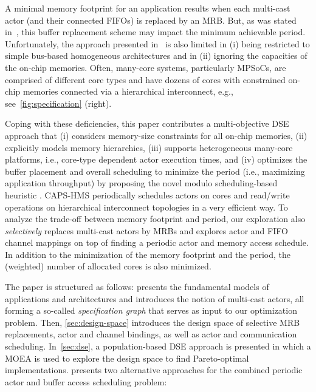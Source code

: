 A minimal memory footprint for an application results when each multi-cast actor (and their connected \acp{FIFO}) is replaced by an \ac{MRB}.
But, as was stated in~\cite{lft_2023-MRBs}, this buffer replacement scheme may impact the minimum achievable period.
Unfortunately, the approach presented in~\cite{lft_2023-MRBs} is also limited in
(i) being restricted to simple bus-based homogeneous architectures and
in (ii) ignoring the capacities of the on-chip memories.
Often, many-core systems, particularly \acp{MPSoC}, are comprised of different core types and have dozens of cores with constrained on-chip memories connected via a hierarchical interconnect, e.g., see~\cref{fig:specification} (right).
\par
Coping with these deficiencies, this paper contributes a multi-objective \ac{DSE} approach that
(i) considers memory-size constraints for all on-chip memories,
(ii) explicitly models memory hierarchies,
(iii) supports heterogeneous many-core platforms, i.e., core-type dependent actor execution times, and
(iv) optimizes the buffer placement and overall scheduling to minimize the period (i.e., maximizing application throughput) by proposing the novel modulo scheduling-based heuristic .
\ac{CAPS-HMS} periodically schedules actors on cores and read/write operations on hierarchical interconnect topologies in a very efficient way.
To analyze the trade-off between memory footprint and period, our exploration also \emph{selectively} replaces multi-cast actors by \acp{MRB} and explores actor and \ac{FIFO} channel mappings on top of finding a periodic actor and memory access schedule.
In addition to the minimization of the memory footprint and the period, the (weighted) number of allocated cores is also minimized.
\par
The paper is structured as follows:
 presents the fundamental models of applications and architectures and introduces the notion of multi-cast actors, all forming a so-called \emph{specification graph} that serves as input to our optimization problem.
Then, \cref{sec:design-space} introduces the design space of selective \ac{MRB} replacements, actor and channel bindings, as well as actor and communication scheduling.
In~\cref{sec:dse}, a population-based \ac{DSE} approach is presented in which a \ac{MOEA} is used to explore the design space to find Pareto-optimal implementations.
 presents two alternative approaches for the combined periodic actor and buffer access scheduling problem:
